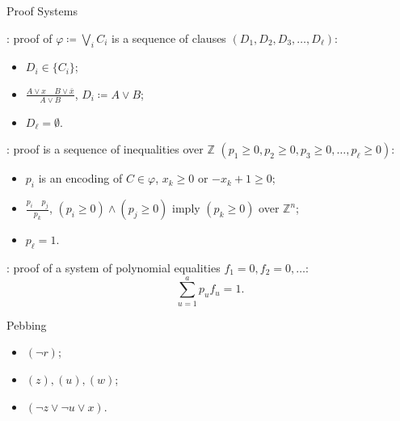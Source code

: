\begin{frame}{Proof Systems}

    : proof of $\varphi \coloneqq \bigvee\limits_{i} C_i$ is a sequence of clauses
    $(D_1, D_2, D_3, \dots, D_{\ell})$:
    \pause
    
    \begin{minipage}{0.3\linewidth}
        \begin{itemize}
            \item $D_i \in \{C_i\}$;
                \pause
            \item $\frac{A \lor x ~~~~~ B \lor \bar{x}}{A \lor B}$, $D_i \coloneqq A \lor B$;
                \pause
            \item $D_{\ell} = \emptyset$.
        \end{itemize}
    \end{minipage}
    \pause
    \begin{minipage}{0.68\linewidth}
        \centering
        
    \end{minipage}


    \pause
    \vspace{0.3cm}

    : proof is a sequence of inequalities over $\mathbb{Z}$
    $(p_1 \ge 0, p_2 \ge 0, p_3 \ge 0, \dots, p_{\ell} \ge 0)$:
    \begin{itemize}
        \item $p_i$ is an encoding of $C \in \varphi$, $x_k \ge 0$ or $-x_k + 1 \ge 0$;
        \item $\frac{p_i ~~~~~ p_j}{p_k}$,  $(p_i \ge 0) \land (p_j \ge 0)$ imply $(p_k \ge 0)$
            \alert{over $\mathbb{Z}^n$};
        \item $p_{\ell} = 1$.
    \end{itemize}

    \pause
    \vspace{0.3cm}

    : proof of a system of polynomial equalities $f_1 = 0, f_2 = 0, \dots$:
    $$
        \sum_{u = 1}^{a} p_u f_u = 1.
    $$
\end{frame}


\begin{frame}{Pebbing}

    \begin{center}
                
    \end{center}

    \pause
    \begin{itemize}
        \item $(\neg r)$;
            \pause
        \item $(z), (u), (w)$;
            \pause
        \item $(\neg z \lor \neg u \lor x)$.    
    \end{itemize}

    \pause
    
\end{frame}

